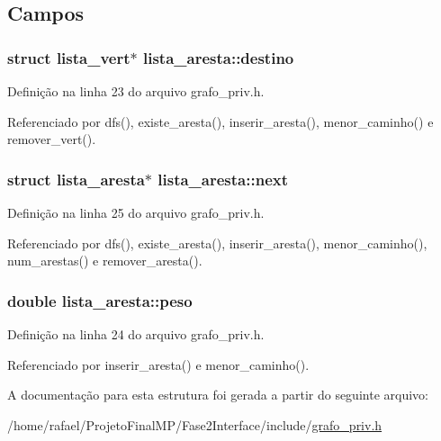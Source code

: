\subsection{Campos}
\hypertarget{structlista__aresta_a324d065ab2fc1df5d59128027c4c8a5a}{}
\subsubsection[{destino}]{\setlength{\rightskip}{0pt plus 5cm}struct {\bf lista\+\_\+vert}$\ast$ lista\+\_\+aresta\+::destino}\label{structlista__aresta_a324d065ab2fc1df5d59128027c4c8a5a}


Definição na linha 23 do arquivo grafo\+\_\+priv.\+h.



Referenciado por dfs(), existe\+\_\+aresta(), inserir\+\_\+aresta(), menor\+\_\+caminho() e remover\+\_\+vert().

\hypertarget{structlista__aresta_a55d9a8d5fcc901c1d8802239735b4af7}{}
\subsubsection[{next}]{\setlength{\rightskip}{0pt plus 5cm}struct {\bf lista\+\_\+aresta}$\ast$ lista\+\_\+aresta\+::next}\label{structlista__aresta_a55d9a8d5fcc901c1d8802239735b4af7}


Definição na linha 25 do arquivo grafo\+\_\+priv.\+h.



Referenciado por dfs(), existe\+\_\+aresta(), inserir\+\_\+aresta(), menor\+\_\+caminho(), num\+\_\+arestas() e remover\+\_\+aresta().

\hypertarget{structlista__aresta_af006bc606a812d12d13d35a4f00c0e6c}{}
\subsubsection[{peso}]{\setlength{\rightskip}{0pt plus 5cm}double lista\+\_\+aresta\+::peso}\label{structlista__aresta_af006bc606a812d12d13d35a4f00c0e6c}


Definição na linha 24 do arquivo grafo\+\_\+priv.\+h.



Referenciado por inserir\+\_\+aresta() e menor\+\_\+caminho().



A documentação para esta estrutura foi gerada a partir do seguinte arquivo\+:\begin{DoxyCompactItemize}
\item 
/home/rafael/\+Projeto\+Final\+M\+P/\+Fase2\+Interface/include/\hyperlink{grafo__priv_8h}{grafo\+\_\+priv.\+h}\end{DoxyCompactItemize}
